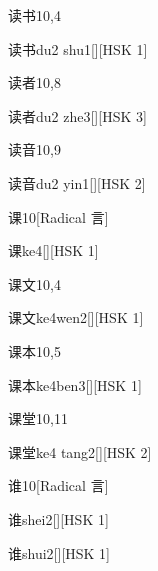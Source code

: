 \begin{entry}{读书}{10,4}
  \begin{phonetics}{读书}{du2 shu1}[][HSK 1]
  \end{phonetics}
\end{entry}

\begin{entry}{读者}{10,8}
  \begin{phonetics}{读者}{du2 zhe3}[][HSK 3]
  \end{phonetics}
\end{entry}

\begin{entry}{读音}{10,9}
  \begin{phonetics}{读音}{du2 yin1}[][HSK 2]
  \end{phonetics}
\end{entry}

\begin{entry}{课}{10}[Radical 言]
  \begin{phonetics}{课}{ke4}[][HSK 1]
  \end{phonetics}
\end{entry}

\begin{entry}{课文}{10,4}
  \begin{phonetics}{课文}{ke4wen2}[][HSK 1]
  \end{phonetics}
\end{entry}

\begin{entry}{课本}{10,5}
  \begin{phonetics}{课本}{ke4ben3}[][HSK 1]
  \end{phonetics}
\end{entry}

\begin{entry}{课堂}{10,11}
  \begin{phonetics}{课堂}{ke4 tang2}[][HSK 2]
  \end{phonetics}
\end{entry}

\begin{entry}{谁}{10}[Radical 言]
  \begin{phonetics}{谁}{shei2}[][HSK 1]
  \end{phonetics}
  \begin{phonetics}{谁}{shui2}[][HSK 1]
  \end{phonetics}
\end{entry}

